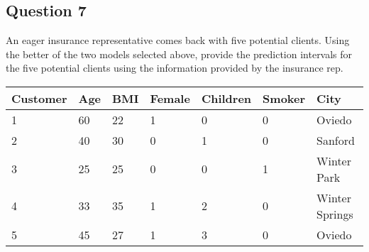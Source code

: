 \documentclass[
]{article}
\begin{document}
\hypertarget{question-7}{%
\subsection{Question 7}\label{question-7}}

An eager insurance representative comes back with five potential
clients. Using the better of the two models selected above, provide the
prediction intervals for the five potential clients using the
information provided by the insurance rep.

\begin{longtable}[]{@{}lllllll@{}}
\toprule()
Customer & Age & BMI & Female & Children & Smoker & City \\
\midrule()
\endhead
1 & 60 & 22 & 1 & 0 & 0 & Oviedo \\
2 & 40 & 30 & 0 & 1 & 0 & Sanford \\
3 & 25 & 25 & 0 & 0 & 1 & Winter Park \\
4 & 33 & 35 & 1 & 2 & 0 & Winter Springs \\
5 & 45 & 27 & 1 & 3 & 0 & Oviedo \\
\bottomrule()
\end{longtable}
\end{document}
